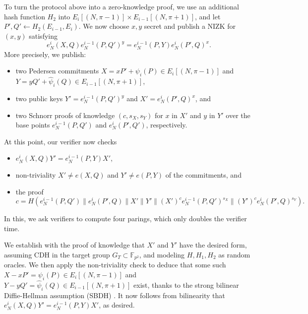 \documentclass{llncs}
\newcommand{\F}{\mathbb{F}}
\begin{document}
To turn the protocol above into a zero-knowledge proof, we use an
additional hash function $H_2$ into
$E_i[(N,\pi-1)]\times E_{i-1}[(N,\pi+1)]$, and let
$P',Q' \gets H_2(E_{i-1},E_i)$. %
We now choose $x,y$ secret and publish a NIZK for $(x,y)$ satisfying
$$ e_N^i(X,Q) e_N^{i-1}(P,Q')^y  = e_N^{i-1}(P,Y) e_N^i(P',Q)^x . $$
More precisely, we publish:
\begin{itemize}
\item two Pedersen commitments 
 $X = x P' + \psi_i(P) \in E_i[(N,\pi-1)]$ and
 $Y = y Q' + \hat\psi_i(Q) \in E_{i-1}[(N,\pi+1)]$,
\item two public keys $Y' = e_N^{i-1}(P,Q')^y$ and $X' = e_N^i(P',Q)^x$, and
\item two Schnorr proofs of knowledge $(c,s_X,s_Y)$ for $x$ in $X'$ and $y$ in $Y'$
over the base points $e_N^{i-1}(P,Q')$ and $e_N^i(P',Q')$, respectively.
\end{itemize}
At this point, our verifier now checks 
\begin{itemize}
\item $e_N^i(X,Q) Y' = e_N^{i-1}(P,Y) X'$,
\item non-triviality $X' \ne e(X,Q)$ and $Y' \ne e(P,Y)$ of the commitments, and
\item the proof
$$ c = H( 
  e_N^{i-1}(P,Q') \| e_N^i(P',Q) \| 
  X' \| Y' \| 
  (X')^c e_N^{i-1}(P,Q')^{s_X} \| 
  (Y')^c e_N^i(P',Q)^{s_Y} 
). $$
\end{itemize}
In this, we ask verifiers to compute four parings, which only doubles
the verifier time.

We establish with the proof of knowledge that $X'$ and $Y'$ have
the desired form, assuming CDH in the target group $G_T\subset\F_{p^2}$,
and modeling $H,H_1,H_2$ as random oracles.
We then apply the non-triviality check to deduce that some such 
 $X - x P' = \psi_i(P) \in E_i[(N,\pi-1)]$ and
 $Y - y Q' = \hat\psi_i(Q) \in E_{i-1}[(N,\pi+1)]$
exist, thanks to the strong bilinear Diffie-Hellman assumption (SBDH) 
\cite{10.1007/978-3-540-74143-5_24}. 
It now follows from bilinearity that $e_N^i(X,Q)Y' = e_N^{i-1}(P,Y)X'$, as desired.
\end{document}
